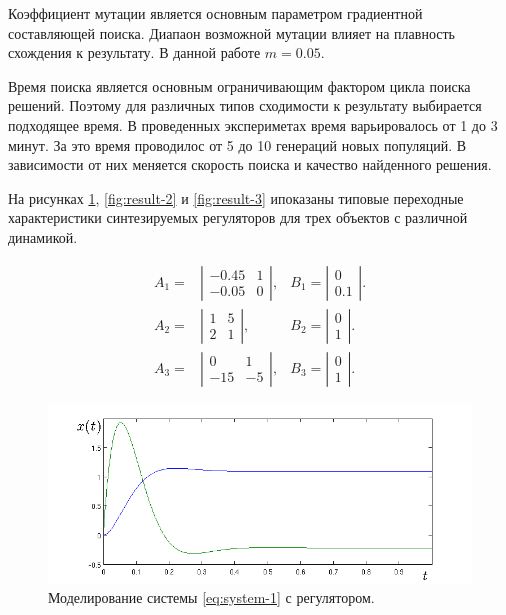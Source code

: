 \documentclass[russian,utf8,emptystyle,12pt]{eskdtext}
\begin{document}
      	Коэффициент мутации является основным параметром градиентной составляющей поиска. Диапаон возможной мутации влияет на плавность схождения к результату. В данной работе $m = 0.05$.
                  
      	Время поиска является основным ограничивающим фактором цикла поиска решений. Поэтому для различных типов сходимости к результату выбирается подходящее время. В проведенных экспериметах время варьировалось от 1 до 3 минут. За это время проводилос от 5 до 10 генераций новых популяций. В зависимости от них меняется скорость поиска и качество найденного решения. 
      
      	На рисунках \ref{fig:result-1}, \ref{fig:result-2} и \ref{fig:result-3} ипоказаны типовые переходные характеристики синтезируемых регуляторов для трех объектов с различной динамикой.
      
	  	\begin{eqnarray}
			A_1 =& \left| \begin{array}{cc} -0.45 & 1 \\ -0.05 & 0 \end{array} \right|,
		    &B_1 = \left| \begin{array}{c} 0 \\ 0.1 \end{array} \right|. 
		    \label{eq:system-1} \\   
			A_2 =& \left| \begin{array}{cc} 1 & 5 \\ 2 & 1 \end{array} \right|,
		    &B_2 = \left| \begin{array}{c} 0 \\ 1 \end{array} \right|. 
		    \label{eq:system-2} \\   
			A_3 =& \left| \begin{array}{cc} 0 & 1 \\ -15 & -5 \end{array} \right|,
		    &B_3 = \left| \begin{array}{c} 0 \\ 1 \end{array} \right|. 
		    \label{eq:system-3}  
		\end{eqnarray}

		\begin{figure}[h]
		    \centering
		    \includegraphics[scale=0.65]{result_1.png}
		    \caption{Моделирование системы \ref{eq:system-1} с регулятором.}
		    \label{fig:result-1}
		\end{figure}
		    
\end{document}
